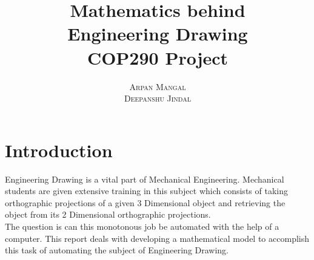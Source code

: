 \documentclass[a4paper,11pt,openany]{book}
\title{\Huge \textbf{Mathematics behind}
 \\
 \Huge \textbf{ Engineering Drawing} \vspace{10pt}\\\huge{COP290 Project }}
\author{\textsc{Arpan Mangal}
 \\
 \textsc{Deepanshu Jindal}}
\begin{document}
\frontmatter
\maketitle

\tableofcontents

\mainmatter

\chapter{Introduction}

\indent Engineering Drawing is a vital part of Mechanical Engineering. Mechanical students are given extensive training in this subject which consists of taking orthographic projections of a given 3 Dimensional object and retrieving the object from its 2 Dimensional orthographic projections. \\
\indent The question is can this monotonous job be automated with the help of a computer. This report deals with developing a mathematical model to accomplish this task of automating the subject of Engineering Drawing.
\end{document}

